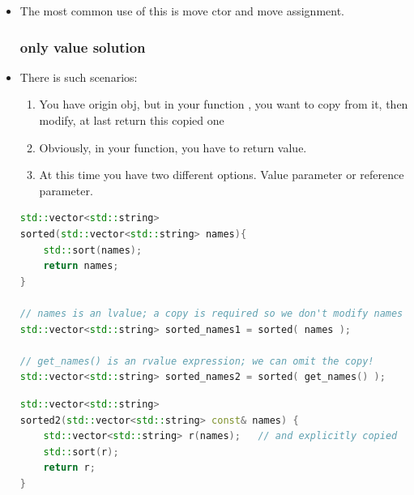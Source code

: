 \documentclass[a4paper,11pt,twoside]{book}
\begin{document}
\begin{itemize}
\item The most common use of this is move ctor and move assignment. 


\subsubsection{only value solution}

\item There is such scenarios:
\begin{enumerate}
	\item You have origin obj, but in your function , you want to copy from it, then modify, at last return this copied one
	\item Obviously, in your function, you have to return value.
	\item At this time you have two different options. Value parameter or reference parameter.
\end{enumerate}

\begin{lstlisting}[frame=single, language=c++]
std::vector<std::string> 
sorted(std::vector<std::string> names){
	std::sort(names);
	return names;
}

// names is an lvalue; a copy is required so we don't modify names
std::vector<std::string> sorted_names1 = sorted( names );

// get_names() is an rvalue expression; we can omit the copy!
std::vector<std::string> sorted_names2 = sorted( get_names() );
\end{lstlisting}

\begin{lstlisting}[frame=single, language=c++]
std::vector<std::string> 
sorted2(std::vector<std::string> const& names) {
	std::vector<std::string> r(names);   // and explicitly copied
	std::sort(r);
	return r;
}
\end{lstlisting}


\end{itemize}
\end{document}
